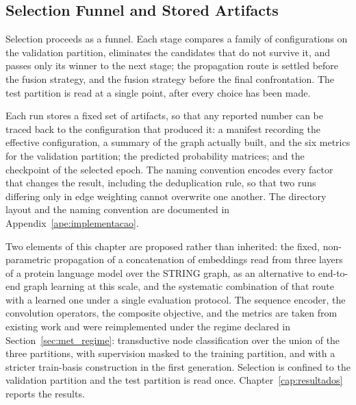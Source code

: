 \documentclass[Ingles]{ic-tese-v3}
\begin{document}
\subsection{Selection Funnel and Stored Artifacts}
\label{sec:met_funil}

Selection proceeds as a funnel. Each stage compares a family of configurations on the validation
partition, eliminates the candidates that do not survive it, and passes only its winner to the next
stage; the propagation route is settled before the fusion strategy, and the fusion strategy before
the final confrontation. The test partition is read at a single point, after every choice has been
made.

Each run stores a fixed set of artifacts, so that any reported number can be traced back to the
configuration that produced it: a manifest recording the effective configuration, a summary of the
graph actually built, and the six metrics for the validation partition; the predicted
probability matrices; and the checkpoint of the selected epoch. The naming
convention encodes every factor that changes the result, including the deduplication rule, so that
two runs differing only in edge weighting cannot overwrite one another. The directory layout and the
naming convention are documented in Appendix~\ref{ape:implementacao}.

Two elements of this chapter are proposed rather than inherited: the fixed, non-parametric
propagation of a concatenation of embeddings read from three layers of a protein language model over
the STRING graph, as an alternative to end-to-end graph learning at this scale, and the systematic
combination of that route with a learned one under a single evaluation protocol. The sequence
encoder, the convolution operators, the composite objective, and the metrics are taken from existing
work and were reimplemented under the regime declared in Section~\ref{sec:met_regime}: transductive
node classification over the union of the three partitions, with supervision masked to the training
partition, and with a stricter train-basis construction in the first generation. Selection is
confined to the validation partition and the test partition is read once.
Chapter~\ref{cap:resultados} reports the results.


\end{document}
